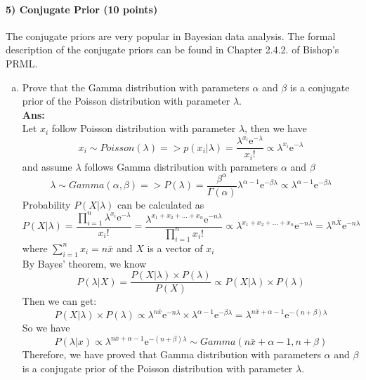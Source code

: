 \documentclass[11pt]{article}
\begin{document}
\paragraph{5) Conjugate Prior (10 points)}
The conjugate priors are very popular in Bayesian data analysis. The formal description of the conjugate priors can be found in Chapter 2.4.2. of Bishop's PRML.
\begin{enumerate}[(a)]
\item Prove that the Gamma distribution with parameters $\alpha$ and $\beta$ is a conjugate prior of the Poisson distribution with parameter $\lambda$.\\
\textbf{Ans:}\\
Let $x_i$ follow Poisson distribution with parameter $\lambda$, then we have
$$x_i \sim Poisson(\lambda) => p(x_i|\lambda) = \frac{\lambda^{x_i} \mathrm{e}^{-\lambda}}{x_i!} \propto \lambda^{x_i} \mathrm{e}^{-\lambda}$$ 
and assume $\lambda$ follows Gamma distribution with parameters $\alpha$ and $\beta$\\
$$\lambda \sim Gamma(\alpha, \beta) => P(\lambda)= \frac{\beta^{\alpha}}{\Gamma (\alpha)}\lambda^{\alpha - 1} \mathrm{e}^{-\beta \lambda } \propto \lambda^{\alpha - 1} \mathrm{e}^{-\beta \lambda}$$
%
Probability $P(X|\lambda)$ can be calculated as 
$$P(X|\lambda) 
= \frac{\prod\limits_{i=1}^n \lambda^{x_i}\mathrm{e}^{-\lambda}}{x_i!} 
= \frac{ \lambda^{x_1+x_2+...+x_n}\mathrm{e}^{-n\lambda}}{\prod\limits_{i=1}^n x_i !}
\propto \lambda^{x_1+x_2+...+x_n}\mathrm{e}^{-n\lambda}
= \lambda^{n\bar{X}}\mathrm{e}^{-n\lambda}$$
%
where $\sum_{i=1}^{n} x_i = n\bar{x}$ and $X$ is a vector of $x_i$\\
%

By Bayes' theorem, we know 
$$P(\lambda | X) 
= \frac{P(X | \lambda) \times P(\lambda)}{P(X)}
\propto  P(X|\lambda) \times P(\lambda)$$ 
Then we can get:
%
$$
P(X|\lambda) \times P(\lambda) \propto \lambda^{n\bar{x}}\mathrm{e}^{-n\lambda}  \times \lambda^{\alpha-1} \mathrm{e}^{-\beta\lambda}
= \lambda^{n\bar{x}+\alpha - 1}\mathrm{e}^{-(n+\beta)\lambda}
$$
So we have 
$$P(\lambda|x) \propto \lambda^{n\bar{x} + \alpha - 1}\mathrm{e}^{-(n + \beta)\lambda} \sim Gamma(n\bar{x}+\alpha-1, n+\beta)$$
Therefore, we have proved that Gamma distribution with parameters $\alpha$ and $\beta$ is a conjugate prior of the Poisson distribution with parameter $\lambda$.



\end{enumerate}
\end{document}
